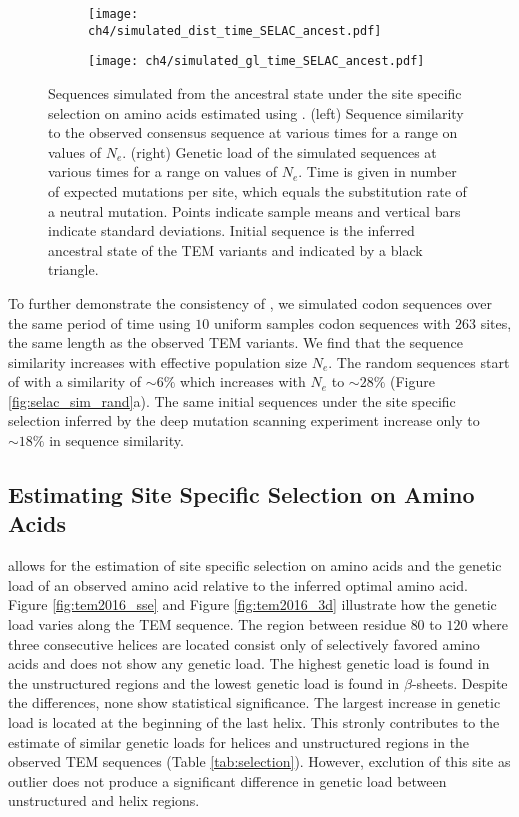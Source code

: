 \begin{figure}[h]
    \centering
    \begin{subfigure}
        \centering
        \texttt{[image: ch4/simulated\_dist\_time\_SELAC\_ancest.pdf]}
    \end{subfigure}
    \begin{subfigure}
        \centering
        \texttt{[image: ch4/simulated\_gl\_time\_SELAC\_ancest.pdf]}
    \end{subfigure}
    \caption{Sequences simulated from the ancestral state under the site specific selection on amino acids estimated using \selac. 
    (left) Sequence similarity to the observed consensus sequence at various times for a range on values of $N_e$.
    (right) Genetic load of the simulated sequences at various times for a range on values of $N_e$.
    Time is given in number of expected mutations per site, which equals the substitution rate of a neutral mutation.
    Points indicate sample means and vertical bars indicate standard deviations. Initial sequence is the inferred ancestral state of the TEM variants and indicated by a black triangle.}
    \label{fig:selac_sim}
\end{figure}

To further demonstrate the consistency of \selac, we simulated codon sequences over the same period of time using $10$ uniform samples codon sequences with $263$ sites, the same length as the observed TEM variants.
We find that the sequence similarity increases with effective population size $N_e$.
The random sequences start of with a similarity of $\sim6 \%$ which increases with $N_e$ to $\sim28 \%$ (Figure \ref{fig:selac_sim_rand}a).
The same initial sequences under the site specific selection inferred by the deep mutation scanning experiment increase only to $\sim18 \%$ in sequence similarity.



\subsection{Estimating Site Specific Selection on Amino Acids}
\selac allows for the estimation of site specific selection on amino acids and the genetic load of an observed amino acid relative to the inferred optimal amino acid.
Figure \ref{fig:tem2016_sse} and Figure \ref{fig:tem2016_3d} illustrate how the genetic load varies along the TEM sequence.
The region between residue $80$ to $120$ where three consecutive helices are located consist only of selectively favored amino acids and does not show any genetic load. 
The highest genetic load is found in the unstructured regions and the lowest genetic load is found in $\beta$-sheets.
Despite the differences, none show statistical significance.
The largest increase in genetic load is located at the beginning of the last helix.
This stronly contributes to the estimate of similar genetic loads for helices and unstructured regions in the observed TEM sequences (Table \ref{tab:selection}).
However, exclution of this site as outlier does not produce a significant difference in genetic load between unstructured and helix regions.

